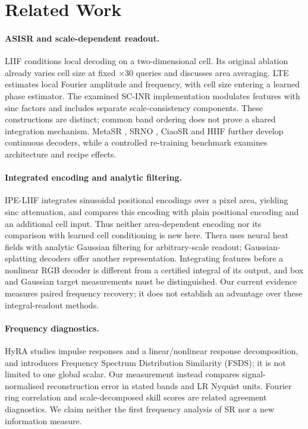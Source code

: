 \section{Related Work}\label{sec:related}

\paragraph{ASISR and scale-dependent readout.}
LIIF \citep{chen2021liif} conditions local decoding on a two-dimensional
cell. Its original ablation already varies cell size at fixed $\times30$
queries and discusses area averaging. LTE \citep{lee2022lte} estimates
local Fourier amplitude and frequency, with cell size entering a learned
phase estimator. The examined SC-INR implementation modulates features
with sinc factors and includes separate scale-consistency components.
These constructions are distinct; common band ordering does not prove a
shared integration mechanism. MetaSR \citep{hu2019metasr}, SRNO
\citep{wei2023srno}, CiaoSR \citep{cao2023ciaosr} and HIIF
\citep{jiang2025hiif} further develop continuous decoders, while a
controlled re-training benchmark \citep{nasir2026empirical} examines
architecture and recipe effects.

\paragraph{Integrated encoding and analytic filtering.}
IPE-LIIF \citep{liu2021ipe} integrates sinusoidal positional encodings over
a pixel area, yielding sinc attenuation, and compares this encoding with
plain positional encoding and an additional cell input. Thus neither
area-dependent encoding nor its comparison with learned cell conditioning
is new here. Thera \citep{becker2025thera} uses neural heat fields with
analytic Gaussian filtering for arbitrary-scale readout; Gaussian-splatting
decoders \citep{chen2025gsasr} offer another representation. Integrating
features before a nonlinear RGB decoder is different from a certified
integral of its output, and box and Gaussian target measurements must be
distinguished. Our current evidence measures paired frequency recovery;
it does not establish an advantage over these integral-readout methods.

\paragraph{Frequency diagnostics.}
HyRA \citep{fsds2024} studies impulse responses and a linear/nonlinear
response decomposition, and introduces Frequency Spectrum Distribution
Similarity (FSDS); it is not limited to one global scalar. Our measurement
instead compares signal-normalised reconstruction error in stated bands
and LR Nyquist units. Fourier ring correlation
\citep{vanheel2005frc} and scale-decomposed skill scores are related
agreement diagnostics. We claim neither the first frequency analysis of
SR nor a new information measure.

